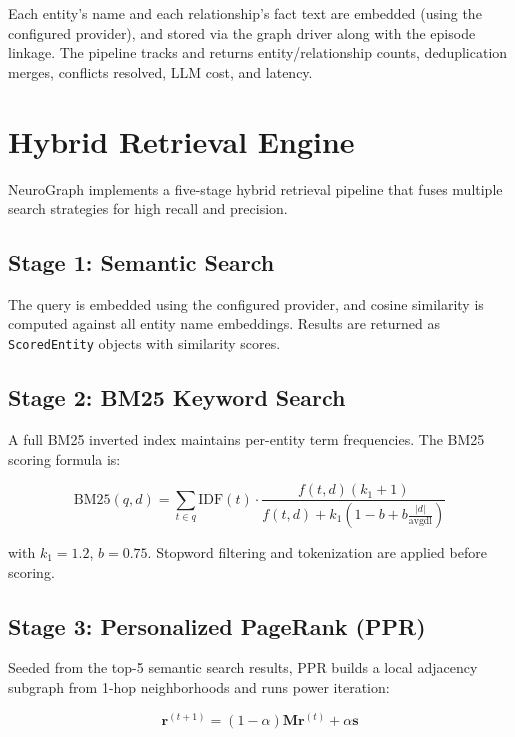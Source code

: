 \documentclass[11pt,twocolumn]{article}
\begin{document}
Each entity's name and each relationship's fact text are embedded (using the configured provider), and stored via the graph driver along with the episode linkage. The pipeline tracks and returns entity/relationship counts, deduplication merges, conflicts resolved, LLM cost, and latency.

\section{Hybrid Retrieval Engine}
\label{sec:retrieval}

NeuroGraph implements a five-stage hybrid retrieval pipeline that fuses multiple search strategies for high recall and precision.

\subsection{Stage 1: Semantic Search}

The query is embedded using the configured provider, and cosine similarity is computed against all entity name embeddings. Results are returned as \texttt{ScoredEntity} objects with similarity scores.

\subsection{Stage 2: BM25 Keyword Search}

A full BM25 inverted index maintains per-entity term frequencies. The BM25 scoring formula is:

\begin{equation}
\text{BM25}(q, d) = \sum_{t \in q} \text{IDF}(t) \cdot \frac{f(t,d)(k_1+1)}{f(t,d)+k_1(1-b+b\frac{|d|}{\text{avgdl}})}
\end{equation}

with $k_1 = 1.2$, $b = 0.75$. Stopword filtering and tokenization are applied before scoring.

\subsection{Stage 3: Personalized PageRank (PPR)}

Seeded from the top-5 semantic search results, PPR builds a local adjacency subgraph from 1-hop neighborhoods and runs power iteration:

\begin{equation}
\mathbf{r}^{(t+1)} = (1-\alpha)\mathbf{M}\mathbf{r}^{(t)} + \alpha\mathbf{s}
\end{equation}
\end{document}
